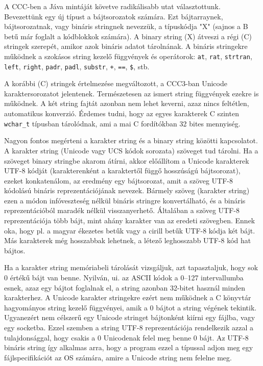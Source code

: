 A CCC-ben a Jáva mintáját követve radikálisabb utat választottunk.
Bevezettünk egy új típust a bájtsorozatok számára. Ezt bájtarraynek,
bájtsorozatnak, vagy bináris stringnek nevezzük, a típuskódja "X"
(sajnos a B betű már foglalt a kódblokkok számára). 
A binary string (X) átveszi a régi
(C) stringek szerepét, amikor azok bináris adatot tárolnának.
A bináris stringekre működnek a szokásos string kezelő függvények
és operátorok: 
\verb!at!, 
\verb!rat!, 
\verb!strtran!, 
\verb!left!, 
\verb!right!, 
\verb!padr!, 
\verb!padl!, 
\verb!substr!, 
\verb!+!, 
\verb!==!, 
\verb!$!, 
stb.

A korábbi (C) stringek értelmezése megváltozott,
a CCC3-ban Unicode karaktersorozatot jelentenek.
Természetesen az ismert string függvények ezekre is működnek.
A két string fajtát azonban nem lehet keverni, azaz nincs
feltétlen, automatikus konverzió.
Érdemes tudni, hogy az egyes karakterek C szinten \verb!wchar_t!
típusban tárolódnak, ami a mai C fordítókban 32 bites mennyiség.

Nagyon fontos megérteni a karakter string és a binary string
közötti kapcsolatot. A karakter string (Unicode vagy UCS kódok
sorozata) szöveget tud tárolni. Ha a szöveget binary stringbe 
akarom átírni, akkor előállítom a Unicode karakterek UTF-8
kódját (karakterenként a karaktertől függő hosszúságú bájtsorozat),
ezeket konkatenálom, az eredmény egy bájtsorozat, amit a 
szöveg UTF-8 kódolású bináris reprezentációjának nevezek.
Bármely szöveg (karakter string) ezen a módon infóveszteség
nélkül bináris stringre konvertálható, és a bináris reprezentációból
maradék nélkül visszanyerhető. Általában a szöveg UTF-8 reprezentációja
több bájt, mint ahány karakter van az eredeti szövegben.
Ennek oka, hogy pl. a magyar ékezetes betűk vagy a cirill
betűk UTF-8 kódja két bájt. Más karakterek még hosszabbak
lehetnek, a létező leghosszabb UTF-8 kód hat bájtos.

Ha a karakter string memóriabeli tárolását vizsgáljuk,
azt tapasztaljuk, hogy sok 0 értékű bájt van benne.
Nyilván, ui. az ASCII kódok a 0--127 intervallumba esnek,
azaz egy bájtot foglalnak el, a string azonban 32-bitet 
használ minden karakterhez. A Unicode karakter stringekre ezért
nem működnek a C könyvtár hagyományos string kezelő függvényei,
amik a 0 bájtot a string végének tekintik. Ugyanezért nem
célszerű egy Unicode stringet bájtonként kiírni egy fájlba,
vagy egy socketba. Ezzel szemben a string UTF-8 reprezentációja
rendelkezik azzal a tulajdonsággal, hogy csakis a 0 Unicodenak
felel meg benne 0 bájt. Az UTF-8 bináris string így alkalmas
arra, hogy a program ezzel a típussal adjon meg egy fájlspecifikációt
az OS számára, amire a Unicode string nem felelne meg.


